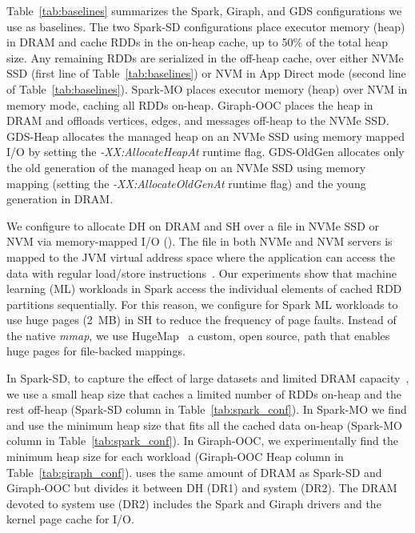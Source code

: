 Table~\ref{tab:baselines} summarizes the Spark, Giraph, and GDS configurations
we use as baselines.
%
The two Spark-SD configurations place executor memory (heap) in DRAM
and cache RDDs in the on-heap cache, up to 50\% of the total heap
size. Any remaining RDDs are serialized in the off-heap cache, over
either NVMe SSD (first line of Table~\ref{tab:baselines}) or NVM in
App Direct mode (second line of Table~\ref{tab:baselines}).
%
Spark-MO places executor memory (heap) over NVM in memory mode,
caching all RDDs on-heap.
%
Giraph-OOC places the heap in DRAM and offloads vertices, edges, and
messages off-heap to the NVMe SSD.
%
GDS-Heap allocates the managed heap on an NVMe SSD using
memory mapped I/O by setting the \emph{-XX:AllocateHeapAt} runtime
flag.
%
GDS-OldGen allocates only the old generation of the managed heap on an
NVMe SSD using memory mapping (setting the \emph{-XX:AllocateOldGenAt}
runtime flag) and the young generation in DRAM.

We configure \teraheapName{} to allocate DH on DRAM and SH over a file in NVMe
SSD or NVM via memory-mapped I/O (\teraheapMMIO). The file in both NVMe and
NVM servers is mapped to the JVM virtual address space where the
application can access the data with regular load/store
instructions~\cite{apapag:fmap}. Our experiments show that machine
learning (ML) workloads in Spark access the individual elements of
cached RDD partitions sequentially. For this reason, we configure
\teraheapName{} for Spark ML workloads to use huge pages (\SI{2}{MB}) in SH to
reduce the frequency of page faults. Instead of the native
\emph{mmap}, we use HugeMap~\cite{jmal:hugemap} a custom, open source,
\teraheapMMIO path that enables huge pages for file-backed mappings.



In Spark-SD, to capture the effect of large datasets and limited DRAM
capacity~\cite{chen:hybrid}, we use a small heap size that caches a
limited number of RDDs on-heap and the rest off-heap (Spark-SD column
in Table~\ref{tab:spark_conf}). In Spark-MO we find and use the
minimum heap size that fits all the cached data on-heap (Spark-MO
column in Table~\ref{tab:spark_conf}). In Giraph-OOC, we
experimentally find the minimum heap size for each workload
(Giraph-OOC Heap column in Table~\ref{tab:giraph_conf}). \teraheapName{} uses
the same amount of DRAM as Spark-SD and Giraph-OOC but divides it
between DH (DR1) and system (DR2). The DRAM devoted to system use
(DR2) includes the Spark and Giraph drivers and the kernel page cache
for I/O.

